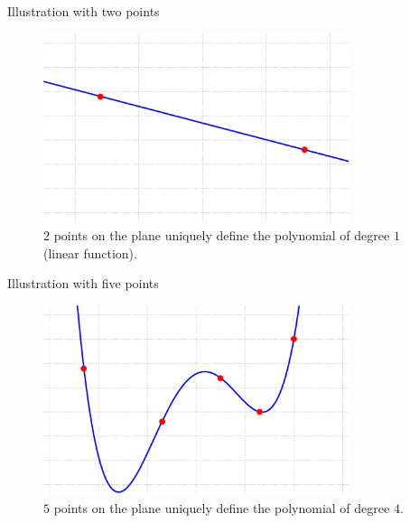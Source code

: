 \documentclass{beamer}
\begin{document}
    \begin{frame}{Illustration with two points}
      \begin{figure}
        \includegraphics[width=0.8\textwidth]{images/lecture_1/simple_interpolation.pdf}
        \caption{$2$ points on the plane uniquely define the polynomial of degree $1$ (linear function).}
        \label{fig:simple_interpolation}
      \end{figure}
    \end{frame}

    \begin{frame}{Illustration with five points}
      \begin{figure}
        \includegraphics[width=0.8\textwidth]{images/lecture_1/interpolation.pdf}
        \caption{$5$ points on the plane uniquely define the polynomial of degree $4$.}
        \label{fig:interpolation}
      \end{figure}
    \end{frame}
\end{document}
